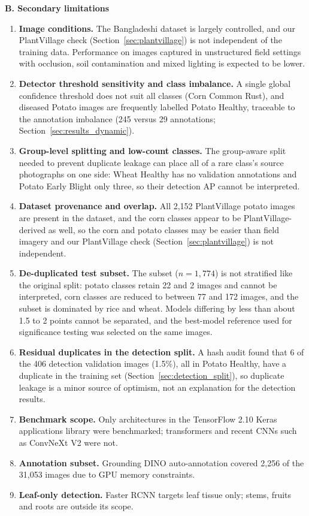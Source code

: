 \textbf{B. Secondary limitations}
\begin{enumerate}
  \item \textbf{Image conditions.} The Bangladeshi dataset is largely
    controlled, and our PlantVillage check (Section~\ref{sec:plantvillage})
    is not independent of the training data. Performance on images captured in unstructured
    field settings with occlusion, soil contamination and mixed
    lighting is expected to be lower.
  \item \textbf{Detector threshold sensitivity and class imbalance.}
    A single global confidence threshold does not suit all classes
    (Corn Common Rust), and diseased Potato images are frequently
    labelled Potato Healthy, traceable to the annotation imbalance
    (245 versus 29 annotations; Section~\ref{sec:results_dynamic}).
  \item \textbf{Group-level splitting and low-count classes.} The
    group-aware split needed to prevent duplicate leakage can place all
    of a rare class's source photographs on one side: Wheat Healthy has
    no validation annotations and Potato Early Blight only three, so
    their detection AP cannot be interpreted.
  \item \textbf{Dataset provenance and overlap.} All 2,152 PlantVillage potato images are present in the dataset, and the corn classes appear to be PlantVillage-derived as well, so the corn and potato classes may be easier than field imagery and our PlantVillage check (Section~\ref{sec:plantvillage}) is not independent.
  \item \textbf{De-duplicated test subset.} The subset ($n=1{,}774$) is not stratified like the original split: potato classes retain 22 and 2 images and cannot be interpreted, corn classes are reduced to between 77 and 172 images, and the subset is dominated by rice and wheat. Models differing by less than about 1.5 to 2 points cannot be separated, and the best-model reference used for significance testing was selected on the same images.
  \item \textbf{Residual duplicates in the detection split.} A hash audit found that 6 of the 406 detection validation images (1.5\%), all in Potato Healthy, have a duplicate in the training set (Section~\ref{sec:detection_split}), so duplicate leakage is a minor source of optimism, not an explanation for the detection results.
  \item \textbf{Benchmark scope.} Only architectures in the TensorFlow
    2.10 Keras applications library were benchmarked; transformers and
    recent CNNs such as ConvNeXt V2 were not.
  \item \textbf{Annotation subset.} Grounding DINO auto-annotation
    covered 2,256 of the 31,053 images due to GPU memory
    constraints.
  \item \textbf{Leaf-only detection.} Faster RCNN targets leaf tissue
    only; stems, fruits and roots are outside its scope.
\end{enumerate}
